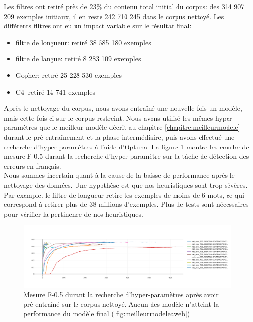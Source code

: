 \documentclass[12pt,twoside,maitrise]{dms}
\theoremstyle{definition}
\numberwithin{equation}{section}
\numberwithin{table}{chapter}
\numberwithin{figure}{chapter}
\begin{document}
Les filtres ont retiré près de 23\% du contenu total initial du corpus: des  314
907 209 exemples initiaux, il en reste 242 710 245 dans le corpus nettoyé. Les
différents filtres ont eu un impact variable sur le résultat final:
\begin{itemize}
	\item filtre de longueur: retiré 38 585 180 exemples
	\item filtre de langue: retiré 8 283 109 exemples
	\item Gopher: retiré 25 228 530 exemples
	\item C4: retiré 14 741 exemples
\end{itemize}
Après le nettoyage du corpus, nous avons entraîné une nouvelle fois un modèle,
mais cette fois-ci sur le corpus restreint. Nous avons utilisé les mêmes
hyper-paramètres que le meilleur modèle décrit au chapitre
\ref{chapitre:meilleurmodele} durant le pré-entraînement et la phase
intermédiaire, puis avons effectué une recherche d'hyper-paramètres à l'aide
d'Optuna. La figure \ref{fig:electrapropre} montre les courbe de mesure F-0.5
durant la recherche d'hyper-paramètre sur la tâche de détection des erreurs en
français.\\

Nous sommes incertain quant à la cause de la baisse de performance après le
nettoyage des données. Une hypothèse est que nos heuristiques sont trop
sévères. Par exemple, le filtre de longueur retire les exemples de moins de 6
mots, ce qui correspond à retirer plus de 38 millions d'exemples. Plus de tests
sont nécessaires pour vérifier la pertinence de nos heuristiques.


\begin{figure}
	\begin{center}
		\includegraphics[width=1.0\textwidth]{figures/electrasentenecepicepropreoptunaf05.png}
	\end{center}
	\caption{Mesure F-0.5 durant la recherche d'hyper-paramètres après avoir
		pré-entraîné sur le corpus nettoyé. Aucun des modèle n'atteint la
		performance du modèle final (\ref{fig:meilleurmodeleaweb})}
	\label{fig:electrapropre}
\end{figure}
\end{document}
